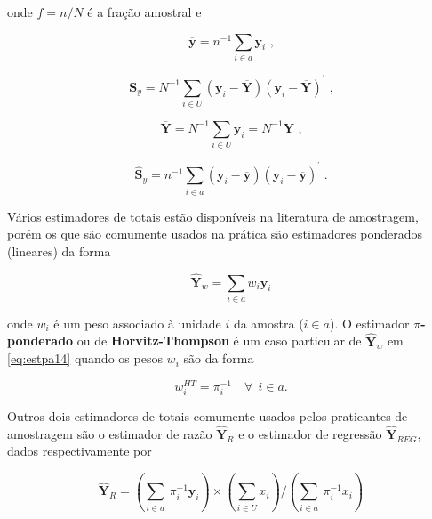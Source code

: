 \documentclass[]{book}
\numberwithin{example}{chapter}
\numberwithin{remark}{chapter}
\numberwithin{definition}{chapter}
\begin{document}
onde \(f=n/N\) é a fração amostral e

\begin{equation}
\overline{\mathbf{y}} = n^{-1} \sum_{i \in a} \mathbf{y}_i \mbox{ ,} \label{eq:estpa10}
\end{equation}

\begin{equation}
\mathbf{S}_y = N^{-1} \sum_{i \in U} \left( \mathbf{y}_i - \overline{\mathbf{Y}}
\right) \left( \mathbf{y}_i - \overline{\mathbf{Y}} \right) ^{^{\prime }} \mbox{ ,}  \label{eq:estpa11}
\end{equation}

\begin{equation}
\overline{\mathbf{Y}} = N^{-1} \sum_{i \in U} \mathbf{y}_i = N^{-1} \mathbf{Y} \mbox{ ,}  \label{eq:estpa12}
\end{equation}

\begin{equation}
\widehat{\mathbf{S}}_y = n^{-1} \sum_{i \in a} \left( \mathbf{y}_i - \overline{\mathbf{y}} \right) \left( \mathbf{y}_i - \overline{\mathbf{y}} \right) ^{^{\prime }} \;. \label{eq:estpa13} 
\end{equation}

Vários estimadores de totais estão disponíveis na literatura de
amostragem, porém os que são comumente usados na prática são estimadores
ponderados (lineares) da forma

\begin{equation}
\mathbf{\hat{Y}}_w = \sum\limits_{i \in a} w_i \mathbf{y}_i  \label{eq:estpa14}
\end{equation}

onde \(w_i\) é um peso associado à unidade \(i\) da amostra
(\(i \in a\)). O estimador \(\pi\)\textbf{-ponderado} ou de
\textbf{Horvitz-Thompson} é um caso particular de \(\mathbf{\hat{Y}}_w\)
em \eqref{eq:estpa14} quando os pesos \(w_i\) são da forma

\[
w_i^{HT} = \pi_i ^{-1} \quad \forall \ \ i \in a. 
\]

Outros dois estimadores de totais comumente usados pelos praticantes de
amostragem são o estimador de razão \(\mathbf{\hat{Y}}_R\) e o estimador
de regressão \(\mathbf{\hat{Y}}_{REG}\), dados respectivamente por

\begin{equation}
\mathbf{\hat{Y}}_R = \left( \sum_{i \in a} {\ \pi_i^{-1}} \mathbf{y}_i \right) \times \left( \sum_{i \in U}x_i \right) / \left( \sum_{i \in a} {\ \pi_i^{-1}} x_i \right)  \label{eq:estpa15}
\end{equation}
\end{document}
